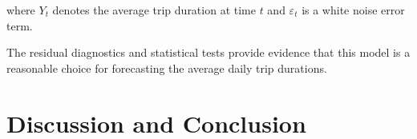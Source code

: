 \documentclass{article}
\begin{document}
where \( Y_t \) denotes the average trip duration at time \( t \) and \( \varepsilon_t \) is a white noise error term.

The residual diagnostics and statistical tests provide evidence that this model is a reasonable choice for forecasting the average daily trip durations.

\section {Discussion and Conclusion}



\end{document}
